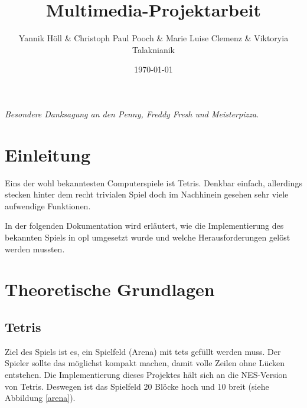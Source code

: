 \documentclass[11pt]{article}
\title{\textbf{Multimedia-Projektarbeit}}
\author{Yannik Höll \& Christoph Paul Pooch \& Marie Luise Clemenz \& Viktoryia Talaknianik}
\date{\today}
\newcommand{\refabb}[1]{Abbildung \ref{#1}}
\begin{document}
\begin{titlingpage}
    \maketitle
\end{titlingpage}
\pagebreak

\vspace*{\fill}
\begin{center}
\textit{
  Besondere Danksagung an den Penny, Freddy Fresh und Meisterpizza.
}
\end{center}
\vspace*{\fill}
\pagebreak

\tableofcontents
\pagebreak

\listoffigures
\pagebreak

\glsaddall
\printglossary 
\pagebreak

\section{Einleitung} 
Eins der wohl bekanntesten Computerspiele ist Tetris. Denkbar einfach, allerdings stecken hinter
dem recht trivialen Spiel doch im Nachhinein gesehen sehr viele aufwendige Funktionen.

In der folgenden Dokumentation wird erläutert, wie die Implementierung des bekannten Spiels in \gls{opl} 
umgesetzt wurde und welche Herausforderungen gelöst werden mussten.

\pagebreak

\section{Theoretische Grundlagen} \label{tgl}

\subsection{Tetris} \label{def-tet}
Ziel des Spiels ist es, ein Spielfeld (Arena) mit \glspl{tet} gefüllt werden muss. Der Spieler sollte das möglichst kompakt machen, 
damit volle Zeilen ohne Lücken entstehen. Die Implementierung dieses Projektes hält sich an die NES-Version von Tetris. 
Deswegen ist das Spielfeld 20 Blöcke hoch und 10 breit (siehe \refabb{arena}). 
\end{document}
